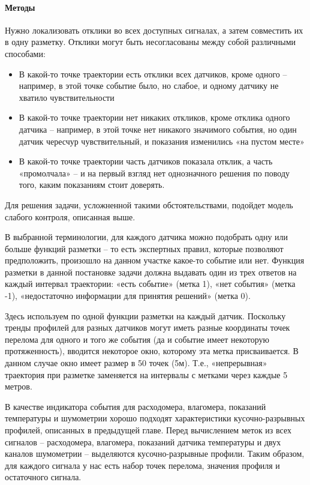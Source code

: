 \paragraph{Методы}
\par
Нужно локализовать отклики во всех доступных сигналах, а затем совместить их в одну разметку. Отклики могут быть несогласованы между собой различными способами:
\begin{itemize}
    \item В какой-то точке траектории есть отклики всех датчиков, кроме одного – например, в этой точке событие было, но слабое, и одному датчику не хватило чувствительности
    \item В какой-то точке траектории нет никаких откликов, кроме отклика одного датчика – например, в этой точке нет никакого значимого события, но один датчик чересчур чувствительный, и показания изменились «на пустом месте»
    \item В какой-то точке траектории часть датчиков показала отклик, а часть «промолчала» – и на первый взгляд нет однозначного решения по поводу того, каким показаниям стоит доверять.
\end{itemize}
\par
Для решения задачи, усложненной такими обстоятельствами, подойдет модель слабого контроля, описанная выше. 
\par
В выбранной терминологии, для каждого датчика можно подобрать одну или больше функций разметки – то есть экспертных правил, которые позволяют предположить, произошло на данном участке какое-то событие или нет. Функция разметки в данной постановке задачи должна выдавать один из трех ответов на каждый интервал траектории: «есть событие» (метка 1), «нет события» (метка -1), «недостаточно информации для принятия решений» (метка 0). 
\par
Здесь используем по одной функции разметки на каждый датчик. Поскольку тренды профилей для разных датчиков могут иметь разные координаты точек перелома для одного и того же события (да и событие имеет некоторую протяженность), вводится некоторое окно, которому эта метка присваивается. В данном случае окно имеет размер в 50 точек (5м). Т.е., «непрерывная» траектория при разметке заменяется на интервалы с метками через каждые 5 метров.
\par
В качестве индикатора события для расходомера, влагомера, показаний температуры и шумометрии хорошо подходят характеристики кусочно-разрывных профилей, описанных в предыдущей главе. Перед вычислением меток из всех сигналов – расходомера, влагомера, показаний датчика температуры и двух каналов шумометрии – выделяются кусочно-разрывные профили. Таким образом, для каждого сигнала у нас есть набор точек перелома, значения профиля и остаточного сигнала.
